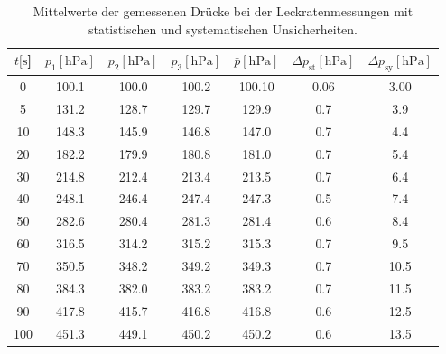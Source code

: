 %
\begin{table}[H]
  \centering
    \caption{Mittelwerte der gemessenen Drücke bei der Leckratenmessungen mit statistischen und systematischen Unsicherheiten.}
    \label{tab:Dreh_Leck4}
    \begin{tabular}{
      S[table-format=3.0] 
      S[table-format=3.1] S[table-format=3.1] S[table-format=3.1]
      S[table-format=3.2] S[table-format=1.2] S[table-format=2.0]
      }
      \toprule
      {$t [\si{\second}$]} &
      {$p_1 [\si{\hecto\pascal}]$} & {$p_2 [\si{\hecto\pascal}]$} & {$p_3 [\si{\hecto\pascal}]$} &
      {$\bar{p} [\si{\hecto\pascal}]$} & {$\Delta p_\text{st} [\si{\hecto\pascal}]$} & {$\Delta p_\text{sy} [\si{\hecto\pascal}]$}\\
         & 100.1 & 100.0 & 100.2 & 100.10 & 0.06 & 3.00 \\
      5   & 131.2 & 128.7 & 129.7 & 129.9  & 0.7  & 3.9  \\
      10  & 148.3 & 145.9 & 146.8 & 147.0  & 0.7  & 4.4  \\
      20  & 182.2 & 179.9 & 180.8 & 181.0  & 0.7  & 5.4  \\
      30  & 214.8 & 212.4 & 213.4 & 213.5  & 0.7  & 6.4  \\
      40  & 248.1 & 246.4 & 247.4 & 247.3  & 0.5  & 7.4  \\
      50  & 282.6 & 280.4 & 281.3 & 281.4  & 0.6  & 8.4  \\
      60  & 316.5 & 314.2 & 315.2 & 315.3  & 0.7  & 9.5  \\
      70  & 350.5 & 348.2 & 349.2 & 349.3  & 0.7  & 10.5 \\
      80  & 384.3 & 382.0 & 383.2 & 383.2  & 0.7  & 11.5 \\
      90  & 417.8 & 415.7 & 416.8 & 416.8  & 0.6  & 12.5 \\
      100 & 451.3 & 449.1 & 450.2 & 450.2  & 0.6  & 13.5 \\
      \bottomrule
    \end{tabular}
\end{table}
\noindent
